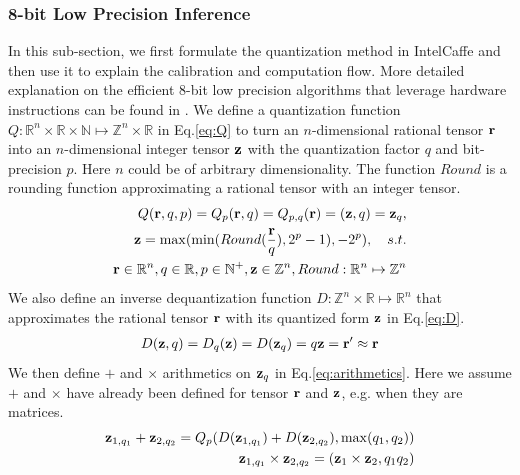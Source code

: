\subsubsection{8-bit Low Precision Inference}
\label{sec:int8}
In this sub-section, we first formulate the quantization method in IntelCaffe and then use it to explain the calibration and computation flow. More detailed explanation on the efficient 8-bit low precision algorithms that leverage hardware instructions can be found in \cite{bib:int8_white_paper}.
We define a quantization function $Q:\mathbb{R}^n\times \mathbb{R} \times \mathbb{N}\mapsto \mathbb{Z}^n\times \mathbb{R}$ in Eq.\ref{eq:Q} to turn an $n$-dimensional rational tensor ${\bf r}$ into an $n$-dimensional integer tensor ${\bf z}$ with the quantization factor $q$ and bit-precision $p$. Here $n$ could be of arbitrary dimensionality. The function $Round$ is a rounding function approximating a rational tensor with an integer tensor.
\begin{align} \label{eq:Q}
\begin{split}
  Q({\bf r},q,p) = Q_{p}({\bf r},q) = Q_{p,q}({\bf r}) = ({\bf z},q) = {\bf z}_q,
  \\
  {\bf z}=\max(\min(Round(\frac{{\bf r}}{q}),2^p-1),-2^p),\quad s.t.
  \\
  {\bf r}\in \mathbb{R}^n, q\in \mathbb{R}, p\in \mathbb{N}^+, {\bf z}\in \mathbb{Z}^n, Round:\mathbb{R}^n\mapsto \mathbb{Z}^n
\end{split}
\end{align}
We also define an inverse dequantization function $D:\mathbb{Z}^n\times \mathbb{R}\mapsto \mathbb{R}^n$ that approximates the rational tensor ${\bf r}$ with its quantized form ${\bf z}$ in Eq.\ref{eq:D}.
\begin{align} \label{eq:D}
  D({\bf z},q) = D_q({\bf z}) = D({\bf z}_q) = q{\bf z} = {\bf r'} \approx {\bf r}
\end{align}
We then define $+$ and $\times$ arithmetics on ${\bf z}_q$ in Eq.\ref{eq:arithmetics}. Here we assume $+$ and $\times$ have already been defined for tensor ${\bf r}$ and ${\bf z}$, e.g. when they are matrices.
\begin{align} \label{eq:arithmetics}
\begin{split}
  {\bf z}_{1,q_1} + {\bf z}_{2,q_2} = Q_p(D({\bf z}_{1,q_1})+D({\bf z}_{2,q_2}),\max(q_1,q_2))
  \\
  {\bf z}_{1,q_1}\times {\bf z}_{2,q_2} = ({\bf z}_1\times {\bf z}_2,q_1q_2)
\end{split}
\end{align}
